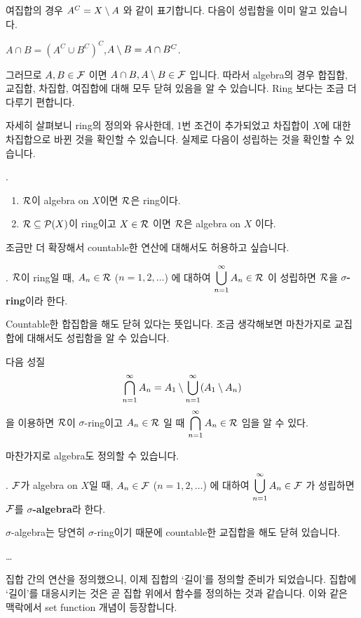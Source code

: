 \rmk 여집합의 경우 \(A^C = X \setminus A\) 와 같이 표기합니다. 다음이 성립함을 이미 알고 있습니다.
\begin{center}
    \(A \cap B = (A^C \cup B^C)^C\),\quad \(A\setminus B = A \cap B^C\).
\end{center}

그러므로 \(A, B \in \mathcal{F}\) 이면 \(A \cap B, A \setminus B \in \mathcal{F}\) 입니다. 따라서 algebra의 경우 합집합, 교집합, 차집합, 여집합에 대해 모두 닫혀 있음을 알 수 있습니다. Ring 보다는 조금 더 다루기 편합니다.

자세히 살펴보니 ring의 정의와 유사한데, 1번 조건이 추가되었고 차집합이 \(X\)에 대한 차집합으로 바뀐 것을 확인할 수 있습니다. 실제로 다음이 성립하는 것을 확인할 수 있습니다.

\prop.
\begin{enumerate}
    \item \(\mathcal{R}\)이 algebra on \(X\)이면 \(\mathcal{R}\)은 ring이다.
    \item \(\mathcal{R} \subseteq \mathcal{P}(X)\)이 ring이고 \(X \in \mathcal{R}\) 이면 \(\mathcal{R}\)은 algebra on \(X\) 이다.
\end{enumerate}

조금만 더 확장해서 countable한 연산에 대해서도 허용하고 싶습니다.

.  \(\mathcal{R}\)이 ring일 때, \(A_n \in \mathcal{R}\) (\(n = 1, 2, \dots\)) 에 대하여 \(\displaystyle \bigcup_{n=1}^\infty A_n \in \mathcal{R}\) 이 성립하면 \(\mathcal{R}\)을 \textbf{\(\sigma\)-ring}이라 한다.

Countable한 합집합을 해도 닫혀 있다는 뜻입니다. 조금 생각해보면 마찬가지로 교집합에 대해서도 성립함을 알 수 있습니다.

\rmk 다음 성질
\[
    \bigcap_{n=1}^\infty A_n = A_1 \setminus \bigcup_{n=1}^\infty (A_1 \setminus A_n)
\]
을 이용하면 \(\mathcal{R}\)이 \(\sigma\)-ring이고 \(A_n \in \mathcal{R}\) 일 때 \(\displaystyle \bigcap_{n=1}^\infty A_n \in \mathcal{R}\) 임을 알 수 있다.

마찬가지로 algebra도 정의할 수 있습니다.

.  \(\mathcal{F}\)가 algebra on \(X\)일 때, \(A_n \in \mathcal{F}\) (\(n = 1, 2, \dots\)) 에 대하여 \(\displaystyle \bigcup_{n=1}^\infty A_n \in \mathcal{F}\) 가 성립하면 \(\mathcal{F}\)를 \textbf{\(\sigma\)-algebra}라 한다.

\(\sigma\)-algebra는 당연히 \(\sigma\)-ring이기 때문에 countable한 교집합을 해도 닫혀 있습니다.

\dots

집합 간의 연산을 정의했으니, 이제 집합의 `길이'를 정의할 준비가 되었습니다. 집합에 `길이'를 대응시키는 것은 곧 집합 위에서 함수를 정의하는 것과 같습니다. 이와 같은 맥락에서 set function 개념이 등장합니다.

